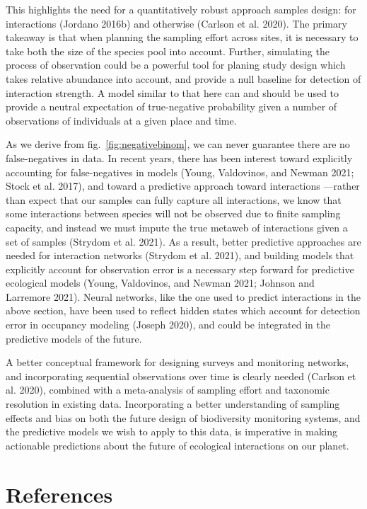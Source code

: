 \documentclass[10pt,oneside]{article}
\begin{document}
This highlights the need for a quantitatively robust approach samples
design: for interactions (Jordano 2016b) and otherwise (Carlson et al.
2020). The primary takeaway is that when planning the sampling effort
across sites, it is necessary to take both the size of the species pool
into account. Further, simulating the process of observation could be a
powerful tool for planing study design which takes relative abundance
into account, and provide a null baseline for detection of interaction
strength. A model similar to that here can and should be used to provide
a neutral expectation of true-negative probability given a number of
observations of individuals at a given place and time.

As we derive from fig.~\ref{fig:negativebinom}, we can never guarantee
there are no false-negatives in data. In recent years, there has been
interest toward explicitly accounting for false-negatives in models
(Young, Valdovinos, and Newman 2021; Stock et al. 2017), and toward a
predictive approach toward interactions ---rather than expect that our
samples can fully capture all interactions, we know that some
interactions between species will not be observed due to finite sampling
capacity, and instead we must impute the true metaweb of interactions
given a set of samples (Strydom et al. 2021). As a result, better
predictive approaches are needed for interaction networks (Strydom et
al. 2021), and building models that explicitly account for observation
error is a necessary step forward for predictive ecological models
(Young, Valdovinos, and Newman 2021; Johnson and Larremore 2021). Neural
networks, like the one used to predict interactions in the above
section, have been used to reflect hidden states which account for
detection error in occupancy modeling (Joseph 2020), and could be
integrated in the predictive models of the future.

A better conceptual framework for designing surveys and monitoring
networks, and incorporating sequential observations over time is clearly
needed (Carlson et al. 2020), combined with a meta-analysis of sampling
effort and taxonomic resolution in existing data. Incorporating a better
understanding of sampling effects and bias on both the future design of
biodiversity monitoring systems, and the predictive models we wish to
apply to this data, is imperative in making actionable predictions about
the future of ecological interactions on our planet.

\hypertarget{references}{%
\section*{References}\label{references}}
\end{document}
